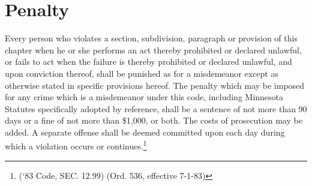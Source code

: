\section{Penalty}
Every person who violates a section, subdivision, paragraph or provision of this chapter when he or she performs an act thereby prohibited or declared unlawful, or fails to act when the failure is thereby prohibited or declared unlawful, and upon conviction thereof, shall be punished as for a misdemeanor except as otherwise stated in specific provisions hereof. The penalty which may be imposed for any crime which is a misdemeanor under this code, including Minnesota Statutes specifically adopted by reference, shall be a sentence of not more than 90 days or a fine of not more than \$1,000, or both. The costs of prosecution may be added. A separate offense shall be deemed committed upon each day during which a violation occurs or continues.\footnote{(‘83 Code, SEC. 12.99)  (Ord. 536, effective 7-1-83)}
